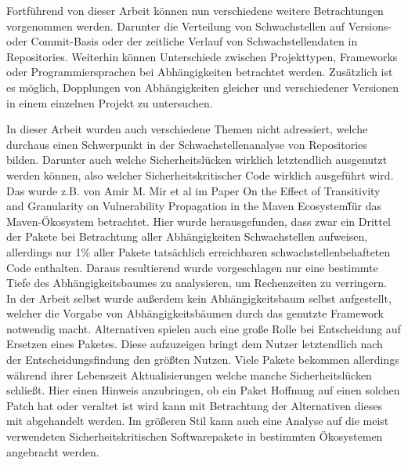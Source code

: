     Fortführend von dieser Arbeit können nun verschiedene weitere Betrachtungen vorgenommen werden.
    Darunter die Verteilung von Schwachstellen auf Versions- oder Commit-Basis oder der zeitliche Verlauf von Schwachstellendaten in Repositories.
    Weiterhin können Unterschiede zwischen Projekttypen, Frameworks oder Programmiersprachen bei Abhängigkeiten betrachtet werden.
    Zusätzlich ist es möglich, Dopplungen von Abhängigkeiten gleicher und verschiedener Versionen in einem einzelnen Projekt zu untersuchen.

    In dieser Arbeit wurden auch verschiedene Themen nicht adressiert, welche durchaus einen Schwerpunkt in der Schwachstellenanalyse von Repositories bilden.
    Darunter auch welche Sicherheitslücken wirklich letztendlich ausgenutzt werden können, also welcher Sicherheitskritischer Code wirklich ausgeführt wird.
    Das wurde z.B. von Amir M. Mir et al im Paper \glqq On the Effect of Transitivity and Granularity on Vulnerability Propagation in the Maven Ecosystem\grqq\~für das Maven-Ökosystem betrachtet.
    Hier wurde herausgefunden, dass zwar ein Drittel der Pakete bei Betrachtung aller Abhängigkeiten Schwachstellen aufweisen, allerdings nur 1\% aller Pakete tatsächlich erreichbaren schwachstellenbehafteten Code enthalten.
    Daraus resultierend wurde vorgeschlagen nur eine bestimmte Tiefe des Abhängigkeitsbaumes zu analysieren, um Rechenzeiten zu verringern.
    \\
    In der Arbeit selbst wurde außerdem kein Abhängigkeitsbaum selbst aufgestellt, welcher die Vorgabe von Abhängigkeitsbäumen durch das genutzte Framework notwendig macht.
    Alternativen spielen auch eine große Rolle bei Entscheidung auf Ersetzen eines Paketes.
    Diese aufzuzeigen bringt dem Nutzer letztendlich nach der Entscheidungsfindung den größten Nutzen.
    Viele Pakete bekommen allerdings während ihrer Lebenszeit Aktualisierungen welche manche Sicherheitslücken schließt.
    Hier einen Hinweis anzubringen, ob ein Paket Hoffnung auf einen solchen Patch hat oder veraltet ist wird kann mit Betrachtung der Alternativen dieses mit abgehandelt werden.
    Im größeren Stil kann auch eine Analyse auf die meist verwendeten Sicherheitskritischen Softwarepakete in bestimmten Ökosystemen angebracht werden. 
